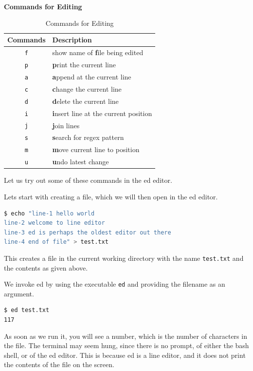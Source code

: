 \textbf{Commands for Editing}

\begin{table}[h!]
  \caption{Commands for Editing}
  \begin{tabular}{ c l }
    \toprule
    Commands & Description \\
    \midrule
    \lstinline|f| & show name of \textbf{f}ile being edited \\
    \lstinline|p| & \textbf{p}rint the current line \\
    \lstinline|a| & \textbf{a}ppend at the current line \\
    \lstinline|c| & \textbf{c}hange the current line \\
    \lstinline|d| & \textbf{d}elete the current line \\
    \lstinline|i| & \textbf{i}nsert line at the current position \\
    \lstinline|j| & \textbf{j}oin lines \\
    \lstinline|s| & \textbf{s}earch for regex pattern \\
    \lstinline|m| & \textbf{m}ove current line to position \\
    \lstinline|u| & \textbf{u}ndo latest change \\
    \bottomrule
  \end{tabular}
\end{table}

Let us try out some of these commands in the ed editor.

Lets start with creating a file, which we will then open
in the ed editor.

\begin{lstlisting}[language=bash]
$ echo "line-1 hello world
line-2 welcome to line editor
line-3 ed is perhaps the oldest editor out there
line-4 end of file" > test.txt
\end{lstlisting}

This creates a file in the current working directory
with the name \lstinline|test.txt| and the contents as
given above.

We invoke ed by using the executable \lstinline|ed|
and providing the filename as an argument.

\begin{lstlisting}[language=bash]
$ ed test.txt
117
\end{lstlisting}

As soon as we run it, you will see a number,
which is the number of characters in the file.
The terminal may seem hung, since there is no
prompt, of either the bash shell, or of the ed editor.
This is because ed is a line editor, and it does not
print the contents of the file on the screen.

